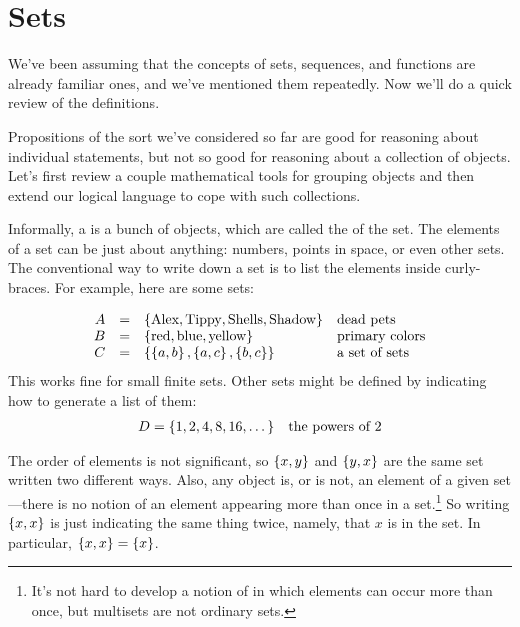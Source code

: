 \label{sets_chap}

\section{Sets}

We've been assuming that the concepts of sets, sequences, and functions are
already familiar ones, and we've mentioned them repeatedly.  Now we'll do a
quick review of the definitions.

\begin{staffnotes}
Propositions of the sort we've considered so far are good for
reasoning about individual statements, but not so good for reasoning
about a collection of objects.  Let's first review a couple
mathematical tools for grouping objects and then extend our logical
language to cope with such collections.
\end{staffnotes}

Informally, a  is a bunch of objects, which are called the
 of the set.  The elements of a set can be just about
anything: numbers, points in space, or even other sets.  The conventional
way to write down a set is to list the elements inside curly-braces.  For
example, here are some sets:

\[
\begin{array}{rcll}
A & = & \left\{\text{Alex}, \text{Tippy}, \text{Shells}, \text{Shadow}\right\} & \text{dead pets} \\
B & = & \left\{\text{red}, \text{blue}, \text{yellow}\right\} & \text{primary colors} \\
C & = & \left\{ \left\{a, b\right\}, \left\{a, c\right\}, \left\{b, c\right\}\right\} & \text{a set of sets}
\end{array}
\]
This works fine for small finite sets.  Other sets might be defined by
indicating how to generate a list of them:
\begin{align*}
D & =  \left\{1,2,4,8,16,\dots\right\} & \text{the powers of 2}
\end{align*}

The order of elements is not significant, so $\left\{x, y\right\}$ and $\left\{y, x\right\}$
are the same set written two different ways.  Also, any object is, or is
not, an element of a given set ---there is no notion of an element
appearing more than once in a set.\footnote{It's not hard to develop a
notion of  in which elements can occur more than once, but
multisets are not ordinary sets.}  So writing $\left\{x,x\right\}$ is just
indicating the same thing twice, namely, that $x$ is in the set.  In
particular, $\left\{x,x\right\} = \left\{x\right\}$.

